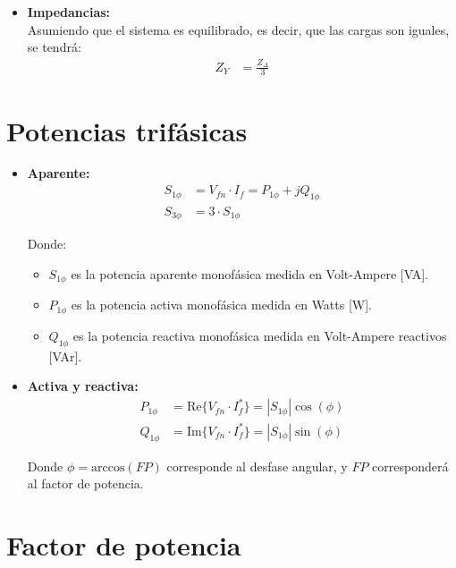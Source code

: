 \documentclass[
  11pt,
  letterpaper,
   addpoints,
   answers
  ]{exam}
\begin{document}
\begin{itemize}
    \item \textbf{Impedancias:} \\
    Asumiendo que el sistema es equilibrado, es decir, que las cargas son iguales, se tendrá:
    \begin{align}
        Z_Y &= \frac{Z_{\Delta}}{3}
    \end{align}
\end{itemize}

\section*{Potencias trifásicas}

\begin{itemize}
    \item \textbf{Aparente:}
    \begin{align}
        S_{1\phi} &= V_{fn} \cdot I_{f} = P_{1\phi} + jQ_{1\phi} \\
        S_{3\phi} &= 3 \cdot S_{1\phi}
    \end{align}
    
    Donde:
    \begin{itemize}
        \item $S_{1\phi}$ es la potencia aparente monofásica medida en Volt-Ampere [VA].
        \item $P_{1\phi}$ es la potencia activa monofásica medida en Watts [W].
        \item $Q_{1\phi}$ es la potencia reactiva monofásica medida en Volt-Ampere reactivos [VAr].
    \end{itemize}
    
    \item \textbf{Activa y reactiva:}
    \begin{align}
        P_{1\phi} &= \text{Re}\{V_{fn} \cdot I_{f}^*\} = |S_{1\phi}|\cos(\phi) \\
        Q_{1\phi} &= \text{Im}\{V_{fn} \cdot I_{f}^*\} = |S_{1\phi}|\sin(\phi)
    \end{align}
    
    Donde $\phi = \text{arccos}(FP)$ corresponde al desfase angular, y $FP$ corresponderá al factor de potencia.
    
\end{itemize}

\section*{Factor de potencia}
\end{document}
